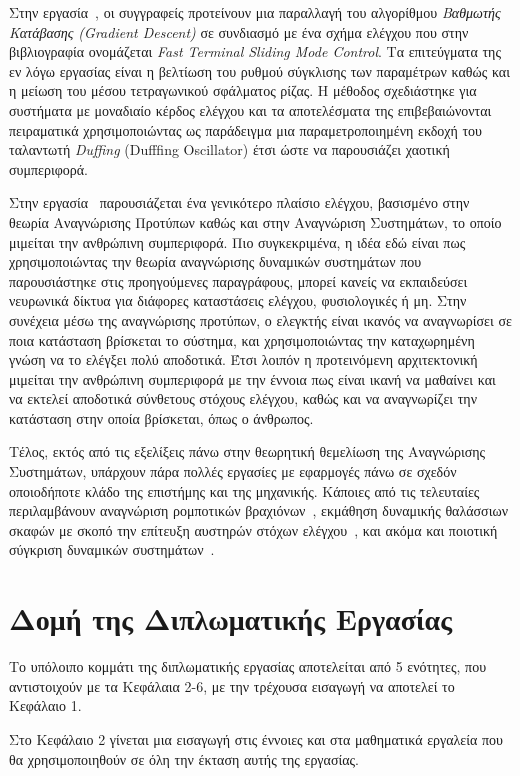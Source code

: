 Στην εργασία~\cite{khazaei2017radial}, οι συγγραφείς προτείνουν μια παραλλαγή του αλγορίθμου \textit{Βαθμωτής Κατάβασης (Gradient Descent)} σε συνδιασμό με ένα σχήμα ελέγχου που στην βιβλιογραφία ονομάζεται \textit{Fast Terminal Sliding Mode Control}. Τα επιτεύγματα της εν λόγω εργασίας είναι η βελτίωση του ρυθμού σύγκλισης των παραμέτρων καθώς και η μείωση του μέσου τετραγωνικού σφάλματος ρίζας. Η μέθοδος σχεδιάστηκε για συστήματα με μοναδιαίο κέρδος ελέγχου και τα αποτελέσματα της επιβεβαιώνονται πειραματικά χρησιμοποιώντας ως παράδειγμα μια παραμετροποιημένη εκδοχή του ταλαντωτή \textit{Duffing} (Dufffing Oscillator) έτσι ώστε να παρουσιάζει χαοτική συμπεριφορά.

Στην εργασία~\cite{yang2017pattern} παρουσιάζεται ένα γενικότερο πλαίσιο ελέγχου, βασισμένο στην θεωρία Αναγνώρισης Προτύπων καθώς και στην Αναγνώριση Συστημάτων, το οποίο μιμείται την ανθρώπινη συμπεριφορά. Πιο συγκεκριμένα, η ιδέα εδώ είναι πως χρησιμοποιώντας την θεωρία αναγνώρισης δυναμικών συστημάτων που παρουσιάστηκε στις προηγούμενες παραγράφους, μπορεί κανείς να εκπαιδεύσει νευρωνικά δίκτυα για διάφορες καταστάσεις ελέγχου, φυσιολογικές ή μη. Στην συνέχεια μέσω της αναγνώρισης προτύπων, ο ελεγκτής είναι ικανός να αναγνωρίσει σε ποια κατάσταση βρίσκεται το σύστημα, και χρησιμοποιώντας την καταχωρημένη γνώση να το ελέγξει πολύ αποδοτικά. Έτσι λοιπόν η προτεινόμενη αρχιτεκτονική μιμείται την ανθρώπινη συμπεριφορά με την έννοια πως είναι ικανή να μαθαίνει και να εκτελεί αποδοτικά σύνθετους στόχους ελέγχου, καθώς και να αναγνωρίζει την κατάσταση στην οποία βρίσκεται, όπως ο άνθρωπος. 

Τέλος, εκτός από τις εξελίξεις πάνω στην θεωρητική θεμελίωση της Αναγνώρισης Συστημάτων, υπάρχουν πάρα πολλές εργασίες με εφαρμογές πάνω σε σχεδόν οποιοδήποτε κλάδο της επιστήμης και της μηχανικής. Κάποιες από τις τελευταίες περιλαμβάνουν αναγνώριση ρομποτικών βραχιόνων~\cite{wang2017dynamic}, εκμάθηση δυναμικής θαλάσσιων σκαφών με σκοπό την επίτευξη αυστηρών στόχων ελέγχου~\cite{dai2016neural}, και ακόμα και ποιοτική σύγκριση δυναμικών συστημάτων~\cite{dong2016modeling}.


\section{Δομή της Διπλωματικής Εργασίας}
Το υπόλοιπο κομμάτι της διπλωματικής εργασίας αποτελείται από 5 ενότητες, που αντιστοιχούν με τα Κεφάλαια 2-6, με την τρέχουσα εισαγωγή να αποτελεί το Κεφάλαιο 1.

Στο Κεφάλαιο 2 γίνεται μια εισαγωγή στις έννοιες και στα μαθηματικά εργαλεία που θα χρησιμοποιηθούν σε όλη την έκταση αυτής της εργασίας. 

